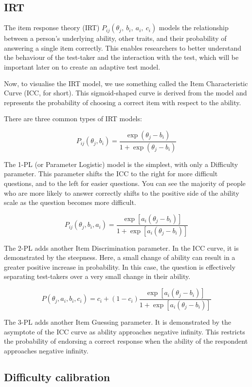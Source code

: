 \documentclass{article}
\begin{document}
\subsection*{IRT}

The item response theory (IRT) $P_{ij}\left(\theta_j,\ b_i,\ a_i,\ c_i\right)$ models the relationship between a person's underlying ability, other traits, and their probability of answering a single item correctly. This enables researchers to better understand the behaviour of the test-taker and the interaction with the test, which will be important later on to create an adaptive test model.

Now, to visualise the IRT model, we use something called the Item Characteristic Curve (ICC, for short). This sigmoid-shaped curve is derived from the model and represents the probability of choosing a correct item with respect to the ability. 

There are three common types of IRT models:

\[
P_{ij}\left(\theta_j,b_i\right)=\frac{\exp(\theta_j-b_i)}{1+\exp(\theta_j-b_i)}
\]

The 1-PL (or Parameter Logistic) model is the simplest, with only a Difficulty parameter. This parameter shifts the ICC to the right for more difficult questions, and to the left for easier questions. You can see the majority of people who are more likely to answer correctly shifts to the positive side of the ability scale as the question becomes more difficult.

\[
P_{ij}\left(\theta_j,b_i,a_i\right)=\frac{\exp\left[a_i(\theta_j-b_i)\right]}{1+\exp\left[a_i(\theta_j-b_i)\right]}
\]

The 2-PL adds another Item Discrimination parameter. In the ICC curve, it is demonstrated by the steepness. Here, a small change of ability can result in a greater positive increase in probability. In this case, the question is effectively separating test-takers over a very small change in their ability.

\[
P(\theta_j,a_i,b_i,c_i)=c_i+(1-c_i)\frac{\exp\left[a_i(\theta_j-b_i)\right]}{1+\exp\left[a_i(\theta_j-b_i)\right]}
\]

The 3-PL adds another Item Guessing parameter. It is demonstrated by the asymptote of the ICC curve as ability approaches negative infinity. This restricts the probability of endorsing a correct response when the ability of the respondent approaches negative infinity.

\subsection*{Difficulty calibration}
\end{document}
